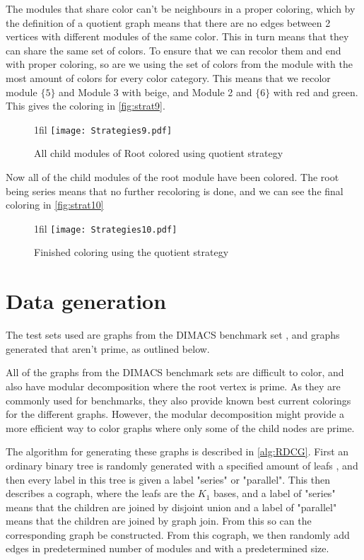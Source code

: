 \documentclass[a4paper]{article}
\makeatletter
\newcommand*{\centerfloat}{%
  \parindent \z@
  \leftskip \z@ \@plus 1fil \@minus \textwidth
  \rightskip\leftskip
  \parfillskip \z@skip}
\makeatother
\begin{document}
The modules that share color can't be neighbours in a proper coloring,
which by the definition of a quotient graph means that there are no edges
between 2 vertices with different modules of the same color. This in turn means
that they can share the same set of colors. To ensure that we can recolor them
and end with proper coloring, so are we using the set of colors from the module
with the most amount of colors for every color category. This means that we
recolor module $\{5\}$ and Module 3 with beige, and Module 2 and $\{6\}$ with
red and green. This gives the coloring in \autoref{fig:strat9}.

\begin{figure}[H]
    \centerfloat
    \texttt{[image: Strategies9.pdf]}
    \caption{All child modules of Root colored using quotient strategy}
    \label{fig:strat9}
\end{figure}

Now all of the child modules of the root module have been colored. The root
being series means that no further recoloring is done, and we can see the final
coloring in \autoref{fig:strat10}
\begin{figure}[H]
    \centerfloat
    \texttt{[image: Strategies10.pdf]}
    \caption{Finished coloring using the quotient strategy}
    \label{fig:strat10}
\end{figure}

\section{Data generation}
\label{sec:Data}

The test sets used are graphs from the DIMACS benchmark set \cite{DIMACS}, 
and graphs generated that aren't prime, as outlined below.

All of the graphs from the DIMACS benchmark sets are difficult to color,
and also have modular decomposition where the root vertex is prime. As they are
commonly used for benchmarks, they also provide known best current colorings for the
different graphs. However, the modular decomposition might provide a more
efficient way to color graphs where only some of the child nodes are prime. 

The algorithm for generating these graphs is described in \autoref{alg:RDCG}.
First an ordinary binary tree is randomly generated with a specified amount of
leafs , and then every label in this tree is given a label "series" or
"parallel".  This then describes a cograph, where the leafs are the $K_1$ bases,
and a label of "series" means that the children are joined by disjoint union and
a label of "parallel" means that the children are joined by graph join.  From
this so can the corresponding graph be constructed. From this cograph, we then
randomly add edges in predetermined number of modules and with a predetermined
size. 
\end{document}
